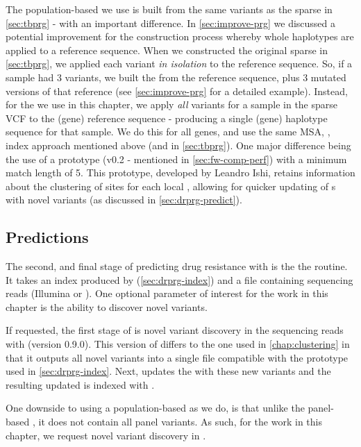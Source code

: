 The population-based \prg{} we use is built from the same variants as the sparse \prg{} in \autoref{sec:tbprg} - with an important difference. In \autoref{sec:improve-prg} we discussed a potential improvement for the \prg{} construction process whereby whole haplotypes are applied to a reference sequence. When we constructed the original sparse \prg{} in \autoref{sec:tbprg}, we applied each variant \emph{in isolation} to the reference sequence. So, if a sample had 3 variants, we built the \prg{} from the reference sequence, plus 3 mutated versions of that reference (see \autoref{sec:improve-prg} for a detailed example). Instead, for the \prg{} we use in this chapter, we apply \emph{all} variants for a sample in the sparse VCF to the (gene) reference sequence - producing a single (gene) haplotype sequence for that sample. We do this for all genes, and use the same MSA, \makeprg{}, \pandora{} index approach mentioned above (and in \autoref{sec:tbprg}). One major difference being the use of a \makeprg{} prototype (v0.2 - mentioned in \autoref{sec:fw-comp-perf}) with a minimum match length of 5. This prototype, developed by Leandro Ishi, retains information about the clustering of sites for each local \prg{}, allowing for quicker updating of \prg{}s with novel variants (as discussed in \autoref{sec:drprg-predict}).


\subsection{Predictions}
\label{sec:drprg-predict}

The second, and final stage of predicting drug resistance with \drprg{} is the the  routine. It takes an index produced by \drprg{}  (\autoref{sec:drprg-index}) and a file containing sequencing reads (Illumina or \ont{}). One optional parameter of interest for the work in this chapter is the ability to discover novel variants.

If requested, the first stage of \drprg{}  is novel variant discovery in the sequencing reads with \pandora{}  (version 0.9.0). This version of \pandora{} differs to the one used in \autoref{chap:clustering} in that it outputs all novel variants into a single file compatible with the \makeprg{} prototype used in \autoref{sec:drprg-index}. Next, \makeprg{} updates the \drprg{} \prg{} with these new variants and the resulting updated \prg{} is indexed with \pandora{}. 

One downside to using a population-based \prg{} as we do, is that unlike the panel-based \prg{}, it does not contain all panel variants. As such, for the work in this chapter, we request novel variant discovery in \drprg{} .

